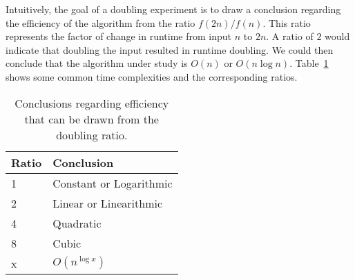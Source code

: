 Intuitively, the goal of a doubling experiment is to draw a conclusion
regarding the efficiency of the algorithm from the ratio
$f(2n)/f(n)$. This ratio represents the factor of change in runtime from
input $n$ to $2n$. A ratio of $2$ would indicate that doubling the
input resulted in runtime doubling. We could then conclude that the
algorithm under study is $O(n)$ or $O(n\log n)$.
Table~\ref{table:ratios} shows some common time complexities and the
corresponding ratios.

\begin{table}[h]
\begin{tabular}{l|l}
Ratio & Conclusion              \\ \hline
1     & Constant or Logarithmic \\
2     & Linear or Linearithmic  \\
4     & Quadratic               \\
8     & Cubic                   \\
x     & $O(n^{\log x})$          
\end{tabular}
\label{table:ratios}
\caption{Conclusions regarding efficiency that can be drawn from the
doubling ratio.}
\end{table}
